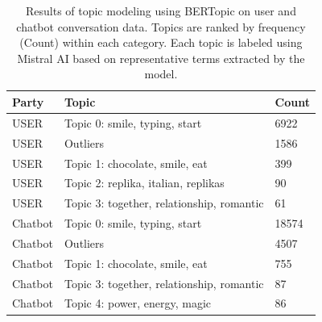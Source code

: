\begin{table}[h!]
\centering
\begin{tabular}{lll}
\hline
\textbf{Party} & \textbf{Topic} & \textbf{Count}\\
\hline
USER & Topic 0: smile, typing, start & 6922\\
USER & Outliers & 1586\\
USER & Topic 1: chocolate, smile, eat & 399\\
USER & Topic 2: replika, italian, replikas & 90\\
USER & Topic 3: together, relationship, romantic & 61\\
\hline
Chatbot & Topic 0: smile, typing, start & 18574\\
Chatbot & Outliers & 4507\\
Chatbot & Topic 1: chocolate, smile, eat & 755\\
Chatbot & Topic 3: together, relationship, romantic & 87\\
Chatbot & Topic 4: power, energy, magic & 86\\
\hline
\end{tabular}
\caption{Results of topic modeling using BERTopic on user and chatbot conversation data. Topics are ranked by frequency (Count) within each category. Each topic is labeled using Mistral AI based on representative terms extracted by the model.}
\label{tab:bertopic-results}
\end{table}
